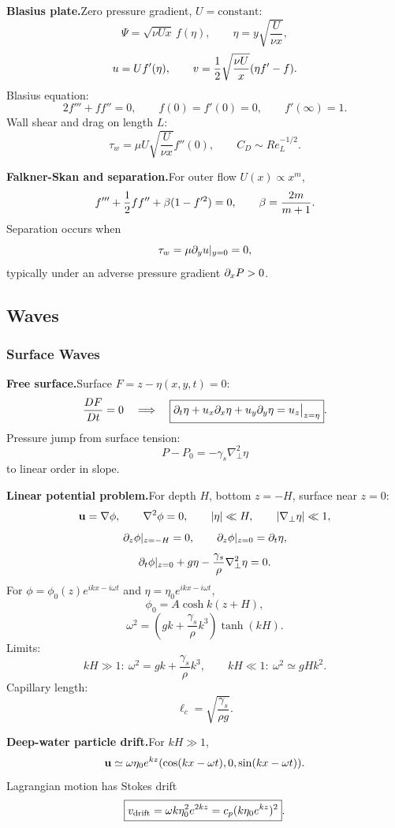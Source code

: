 \noindent\textbf{Blasius plate.}\quad Zero pressure gradient, $U=\text{constant}$:
\[
  \Psi=\sqrt{\nu Ux}\,f(\eta),
  \qquad
  \eta=y\sqrt{\frac{U}{\nu x}},
\]
\[
  u=Uf'(\eta),\qquad
  v=\frac{1}{2}\sqrt{\frac{\nu U}{x}}(\eta f'-f).
\]
Blasius equation:
\[
  \boxed{2f'''+ff''=0},
  \qquad
  f(0)=f'(0)=0,\qquad f'(\infty)=1.
\]
Wall shear and drag on length $L$:
\[
  \tau_w=\mu U\sqrt{\frac{U}{\nu x}}f''(0),
  \qquad
  C_D\sim Re_L^{-1/2}.
\]

\noindent\textbf{Falkner-Skan and separation.}\quad For outer flow $U(x)\propto x^m$,
\[
  f'''+\frac{1}{2} ff''+\beta(1-f'^2)=0,
  \qquad
  \beta=\frac{2m}{m+1}.
\]
Separation occurs when
\[
  \tau_w=\mu\partial_yu|_{y=0}=0,
\]
typically under an adverse pressure gradient $\partial_xP>0$.

\subsection{Waves}

\subsubsection*{Surface Waves}

\noindent\textbf{Free surface.}\quad Surface $F=z-\eta(x,y,t)=0$:
\[
  \frac{DF}{Dt}=0
  \quad\Longrightarrow\quad
  \boxed{\partial_t\eta+u_x\partial_x\eta+u_y\partial_y\eta=u_z\big|_{z=\eta}}.
\]
Pressure jump from surface tension:
\[
  \boxed{P-P_0=-\gamma_s\nabla_\perp^2\eta}
\]
to linear order in slope.

\noindent\textbf{Linear potential problem.}\quad For depth $H$, bottom $z=-H$, surface near $z=0$:
\[
  \mathbf{u}=\nabla\phi,\qquad \nabla^2\phi=0,\qquad |\eta|\ll H,\qquad |\nabla_\perp\eta|\ll1,
\]
\[
  \partial_z\phi|_{z=-H}=0,
  \qquad
  \partial_z\phi|_{z=0}=\partial_t\eta,
\]
\[
  \partial_t\phi|_{z=0}+g\eta-\frac{\gamma_s}{\rho}\nabla_\perp^2\eta=0.
\]
For $\phi=\phi_0(z)e^{ikx-i\omega t}$ and $\eta=\eta_0e^{ikx-i\omega t}$,
\[
  \phi_0=A\cosh k(z+H),
\]
\[
  \boxed{\omega^2=\left(gk+\frac{\gamma_s}{\rho}k^3\right)\tanh(kH)}.
\]
Limits:
\[
  kH\gg1:\ \omega^2=gk+\frac{\gamma_s}{\rho}k^3,
  \qquad
  kH\ll1:\ \omega^2\simeq gHk^2.
\]
Capillary length:
\[
  \ell_c=\sqrt{\frac{\gamma_s}{\rho g}}.
\]

\noindent\textbf{Deep-water particle drift.}\quad For $kH\gg1$,
\[
  \mathbf{u}\simeq\omega\eta_0e^{kz}
  (\cos(kx-\omega t),0,\sin(kx-\omega t)).
\]
Lagrangian motion has Stokes drift
\[
  \boxed{v_{\rm drift}=\omega k\eta_0^2e^{2kz}
  =c_p(k\eta_0e^{kz})^2}.
\]

